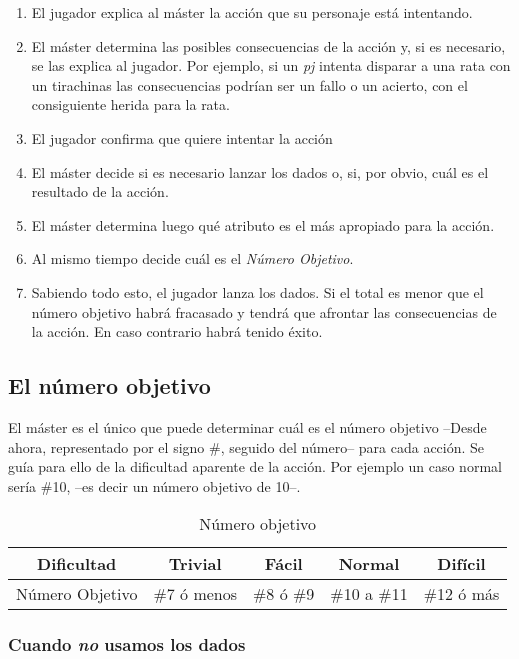 \begin{enumerate}
\item El jugador explica al máster la acción que su personaje está intentando.
\item El máster determina las posibles consecuencias de la acción y, 
si es necesario, se las explica al jugador. Por ejemplo, si un \emph{pj} intenta disparar a una rata con un tirachinas las consecuencias podrían ser un fallo o un acierto, con el consiguiente herida para la rata.
\item El jugador confirma que quiere intentar la acción
\item El máster decide si es necesario lanzar los dados o, si, por obvio, cuál es el resultado de la acción.
\item El máster determina luego qué atributo es el más apropiado para la acción.
\item Al mismo tiempo decide cuál es el \emph{Número Objetivo}.
\item Sabiendo todo esto, el jugador lanza los dados. Si el total es menor que el número objetivo habrá fracasado y tendrá que afrontar las consecuencias de la acción. En caso contrario habrá tenido éxito.
\end{enumerate}

\subsection{El número objetivo}
El máster es el único que puede determinar cuál es el número objetivo --Desde ahora, representado por el signo \#, seguido del número--  para cada acción. Se guía para ello de la dificultad aparente de la acción. Por ejemplo un caso normal sería \#10, --es decir un número objetivo de 10--.

\begin{table}[h]
\centering
\begin{tabular}{ccccc}
\toprule
Dificultad&Trivial&Fácil&Normal&Difícil\\\midrule
Número Objetivo&\#7 ó menos&\#8 ó \#9&\#10 a \#11&\#12 ó más\\\midrule
\bottomrule
\end{tabular}
\caption{Número objetivo}
\end{table}

\subsubsection*{Cuando \emph{no} usamos los dados}

